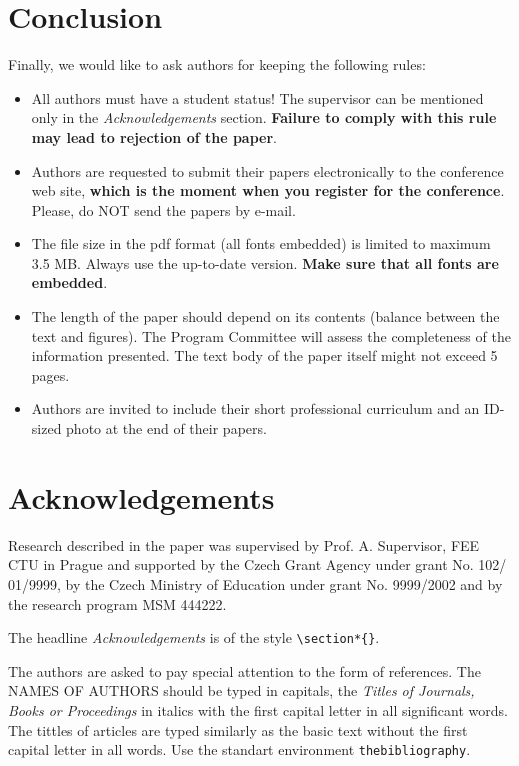 \documentclass{poster16}
\begin{document}
\section{Conclusion}
Finally, we would like to ask authors for keeping the following rules:
\begin{itemize}
\item All authors must have a student status! The supervisor can be mentioned only in the \emph{Acknowledgements} section. \textbf{Failure to comply with this rule may lead to rejection of the paper}.

\item Authors are requested to submit their papers electronically to the conference web site, \textbf{which is the moment when you register for the conference}. Please, do NOT send the papers by e-mail. 

\item The file size in the pdf format (all fonts embedded) is limited to maximum 3.5 MB. Always use the up-to-date version. \textbf{Make sure that all fonts are embedded}. 

\item The length of the paper should depend on its contents (balance between the text and figures). The Program Committee will assess the completeness of the information presented. The text body of the paper itself might not exceed 5 pages. 

\item Authors are invited to include their short professional curriculum and an ID-sized photo at the end of their papers.
\end{itemize}

\section*{Acknowledgements}
Research described in the paper was supervised by Prof. A. Supervisor, FEE CTU in Prague and supported by the Czech Grant Agency under grant No. 102/ 01/9999, by the Czech Ministry of Education under grant No. 9999/2002 and by the research program MSM 444222.

The headline \emph{Acknowledgements} is of the  style \verb+\section*{}+.

The authors are asked to pay special attention to the form of references. The NAMES OF AUTHORS should be typed in capitals, the \emph{Titles of Journals, Books or Proceedings} in italics with the first capital letter in all significant words. The tittles of articles are typed similarly as the basic text without the first capital letter in all words. Use the standart environment \verb+thebibliography+.
\end{document}
